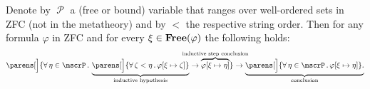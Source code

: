 \begin{theorem}\label{def:well_ordered_induction}
  Denote by \( \mscrP \) a (free or bound) variable that ranges over well-ordered sets in ZFC (not in the metatheory) and by \( < \) the respective string order. Then for any formula \( \varphi \) in ZFC and for every \( \xi \in \operatorname{\mathbf{Free}}(\varphi) \) the following holds:
  \begin{equation}\label{eq:def:well_ordered_induction}
    \parens[\Big]
      {
        \qforall {\eta \in \mscrP}
          \underbrace
            {
              \parens[\Big] { \qforall {\zeta < \eta} \varphi[\xi \mapsto \zeta] }
            }_{\T{inductive hypothesis}}
        \rightarrow
        \overbrace{ \varphi[\xi \mapsto \eta] }^{\mathclap{\T{inductive step conclusion}}}
      }
    \rightarrow
    \underbrace
      {
        \parens[\Big]{ \qforall {\eta \in \mscrP} \varphi[\xi \mapsto \eta] }.
      }_{\T{conclusion}}
  \end{equation}
\end{theorem}
